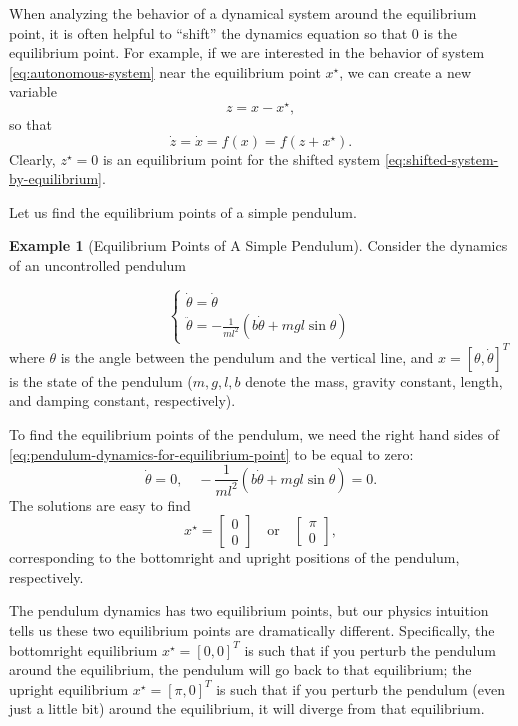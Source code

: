 \documentclass[
]{book}
\theoremstyle{definition}
\theoremstyle{definition}
\newtheorem{example}{Example}[chapter]
\theoremstyle{definition}
\theoremstyle{definition}
\theoremstyle{remark}
\begin{document}
When analyzing the behavior of a dynamical system around the equilibrium point, it is often helpful to ``shift'' the dynamics equation so that \(0\) is the equilibrium point. For example, if we are interested in the behavior of system \eqref{eq:autonomous-system} near the equilibrium point \(x^\star\), we can create a new variable
\[
z = x - x^\star,
\]
so that
\begin{equation}
\dot{z} = \dot{x} = f(x) = f(z + x^\star).
\label{eq:shifted-system-by-equilibrium}
\end{equation}
Clearly, \(z^\star = 0\) is an equilibrium point for the shifted system \eqref{eq:shifted-system-by-equilibrium}.

Let us find the equilibrium points of a simple pendulum.

\begin{example}[Equilibrium Points of A Simple Pendulum]
\protect\hypertarget{exm:pendulumequilibriumpoint}{}\label{exm:pendulumequilibriumpoint}Consider the dynamics of an uncontrolled pendulum

\begin{equation}
\begin{cases}
\dot{\theta} = \dot{\theta} \\
\ddot{\theta} = - \frac{1}{ml^2} (b \dot{\theta} + mgl \sin \theta)
\end{cases}
\label{eq:pendulum-dynamics-for-equilibrium-point}
\end{equation}
where \(\theta\) is the angle between the pendulum and the vertical line, and \(x = [\theta,\dot{\theta}]^T\) is the state of the pendulum (\(m,g,l,b\) denote the mass, gravity constant, length, and damping constant, respectively).

To find the equilibrium points of the pendulum, we need the right hand sides of \eqref{eq:pendulum-dynamics-for-equilibrium-point} to be equal to zero:
\[
\dot{\theta} = 0, \quad - \frac{1}{ml^2} (b \dot{\theta} + mgl \sin \theta) = 0.
\]
The solutions are easy to find
\[
x^\star = \begin{bmatrix} 0 \\ 0 \end{bmatrix} \quad \text{or} \quad \begin{bmatrix} \pi \\ 0 \end{bmatrix},
\]
corresponding to the bottomright and upright positions of the pendulum, respectively.
\end{example}

The pendulum dynamics has two equilibrium points, but our physics intuition tells us these two equilibrium points are dramatically different. Specifically, the bottomright equilibrium \(x^\star = [0,0]^T\) is such that if you perturb the pendulum around the equilibrium, the pendulum will go back to that equilibrium; the upright equilibrium \(x^\star = [\pi,0]^T\) is such that if you perturb the pendulum (even just a little bit) around the equilibrium, it will diverge from that equilibrium.
\end{document}
